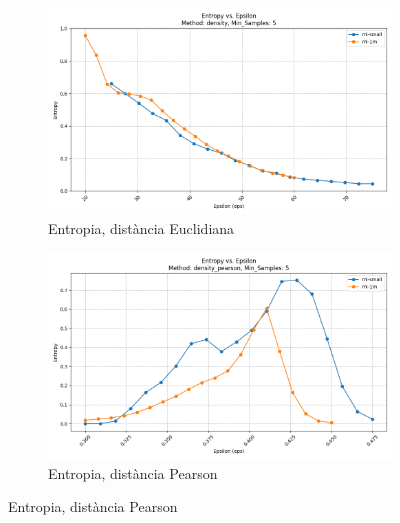 \documentclass[a4paper,12pt]{report}
\begin{document}
\begin{figure}[H]
    \begin{subfigure}[b]{0.49\textwidth}
        \includegraphics[width=\textwidth]{Figuras/DBSCAN/res/ml-small_ml-1m_density_entropy_vs_eps.png}
        \caption{Entropia, distància Euclidiana}
        \label{fig:dbscan-clustering-results-e}
    \end{subfigure}
    \hfill
    \begin{subfigure}[b]{0.49\textwidth}
        \includegraphics[width=\textwidth]{Figuras/DBSCAN/res/ml-small_ml-1m_density_pearson_entropy_vs_eps.png}
        \caption{Entropia, distància Pearson}
        \label{fig:dbscan-clustering-results-f}
    \end{subfigure}


\end{figure}
\end{document}
